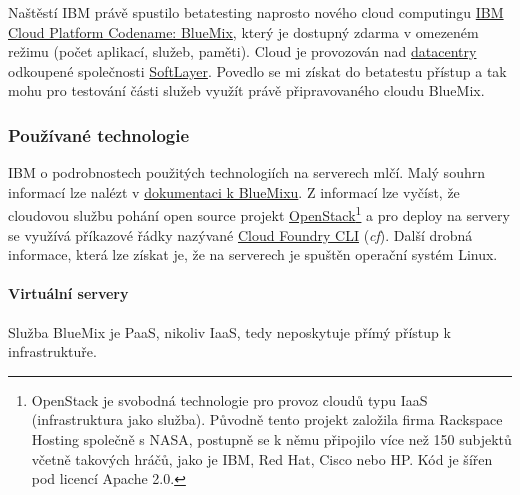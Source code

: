 Naštěstí IBM právě spustilo betatesting naprosto nového cloud computingu \href{https://ace.ng.bluemix.net/}{IBM Cloud Platform Codename: BlueMix}\cite{bluemix:web}, který je dostupný zdarma v omezeném režimu (počet aplikací, služeb, paměti). Cloud je provozován nad \href{https://www.softlayer.com/about/datacenters}{datacentry} odkoupené společnosti \href{https://www.softlayer.com/}{SoftLayer}. Povedlo se mi získat do betatestu přístup a tak mohu pro testování části služeb využít právě připravovaného cloudu BlueMix.

\subsubsection{Používané technologie}
IBM o podrobnostech použitých technologiích na serverech mlčí. Malý souhrn informací lze nalézt v \href{https://www.ng.bluemix.net/docs/DeepDive.html}{dokumentaci k BlueMixu}. Z informací lze vyčíst, že cloudovou službu pohání open source projekt \href{https://www.openstack.org/}{OpenStack}\footnote{OpenStack je svobodná technologie pro provoz cloudů typu IaaS (infrastruktura jako služba). Původně tento projekt založila firma Rackspace Hosting společně s NASA, postupně se k němu připojilo více než 150 subjektů včetně takových hráčů, jako je IBM, Red Hat, Cisco nebo HP. Kód je šířen pod licencí Apache 2.0.\cite{toposs:openStack}} a pro deploy na servery se využívá příkazové řádky nazývané \href{https://github.com/cloudfoundry/cli}{Cloud Foundry CLI} (\textit{cf}). Další drobná informace, která lze získat je, že na serverech je spuštěn operační systém Linux.

\paragraph{Virtuální servery}
Služba BlueMix je PaaS, nikoliv IaaS, tedy neposkytuje přímý přístup k infrastruktuře.

